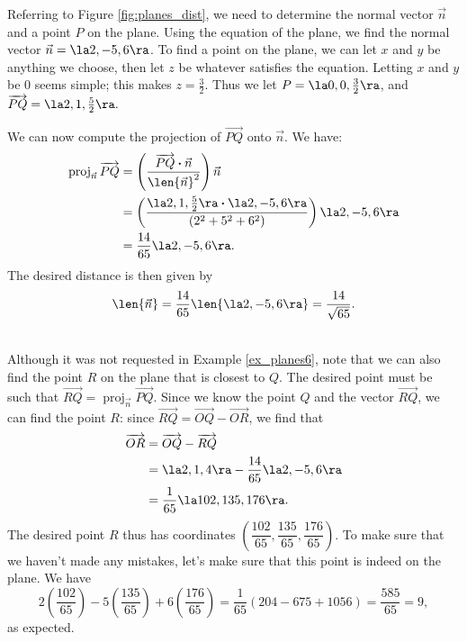 {Referring to Figure \ref{fig:planes_dist}, we need to determine the normal vector $\vec n$ and a point $P$ on the plane. Using the equation of the plane, we find the normal vector $\vec n = \la 2,-5,6\ra$. To find a point on the plane, we can let $x$ and $y$ be anything we choose, then let $z$ be whatever satisfies the equation. Letting $x$ and $y$ be 0 seems simple; this makes $z = \frac{3}{2}$. Thus we let $P = \la 0,0,\frac{3}{2}\ra$, and $\overrightarrow{PQ} = \la 2,1,\frac{5}{2}\ra.$

We can now compute the projection of $\overrightarrow{PQ}$ onto $\vec n$. We have:
\begin{align*}
\operatorname{proj}_{\vec n}\overrightarrow{PQ} & = \left(\frac{\overrightarrow{PQ}\boldsymbol{\cdot}\vec n}{\len{\vec n}^2}\right)\vec n\\
 & = \left(\frac{\la 2, 1, \frac{5}{2}\ra \boldsymbol{\cdot} \la 2, -5, 6\ra}{(2^2+5^2+6^2)}\right)\la 2, -5, 6\ra\\
 & = \frac{14}{65}\la 2, -5, 6\ra.
\end{align*}
The desired distance is then given by
\[
\len{\vec n} = \frac{14}{65}\len{\la 2, -5, 6\ra} = \frac{14}{\sqrt{65}}.
\]
\baselineskip
}\\

Although it was not requested in Example \ref{ex_planes6}, note that we can also find the point $R$ on the plane that is closest to $Q$. The desired point must be such that $\overrightarrow{RQ} = \operatorname{proj}_{\vec n}\overrightarrow{PQ}$. Since we know the point $Q$ and the vector $\overrightarrow{RQ}$, we can find the point $R$: since $\overrightarrow{RQ} = \overrightarrow{OQ}-\overrightarrow{OR}$, we find that
\begin{align*}
\overrightarrow{OR} & = \overrightarrow{OQ}-\overrightarrow{RQ}\\
 & = \la 2, 1, 4\ra - \frac{14}{65}\la 2, -5, 6\ra\\
 & = \frac{1}{65}\la 102, 135, 176\ra.
\end{align*}
The desired point $R$ thus has coordinates $\left(\dfrac{102}{65}, \dfrac{135}{65}, \dfrac{176}{65}\right)$. To make sure that we haven't made any mistakes, let's make sure that this point is indeed on the plane. We have
\[
2\left(\frac{102}{65}\right)-5\left(\frac{135}{65}\right)+6\left(\frac{176}{65}\right) = \frac{1}{65}(204-675+1056) = \frac{585}{65}=9,
\]
as expected.\\

